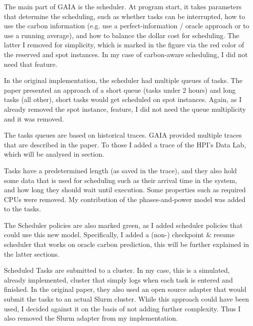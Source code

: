The main part of GAIA is the scheduler. At program start, it takes parameters that determine the scheduling, such as whether tasks can be interrupted, how to use the carbon information (e.g. use a perfect-information / oracle approach or to use a running average), and how to balance the dollar cost for scheduling. 
The latter I removed for simplicity, which is marked in the figure via the red color of the reserved and spot instances. In my case of carbon-aware scheduling, I did not need that feature.

In the original implementation, the scheduler had multiple queues of tasks. 
The paper presented an approach of a short queue (tasks under 2 hours) and long tasks (all other), short tasks would get scheduled on spot instances. 
Again, as I already removed the spot instance, feature, I did not need the queue multiplicity and it was removed.

The tasks queues are based on historical traces. GAIA provided multiple traces that are described in the paper. To those I added a trace of the HPI's Data Lab, which will be analysed in section.

Tasks have a predetermined length (as saved in the trace), and they also hold some data that is used for scheduling such as their arrival time in the system, and how long they should wait until execution. 
Some properties such as required CPUs were removed.
My contribution of the phases-and-power model was added to the tasks.

The Scheduler policies are also marked green, as I added scheduler policies that could use this new model. Specifically, I added a (non-) checkpoint \& resume scheduler that works on oracle carbon prediction, this will be further explained in the latter sections.

Scheduled Tasks are submitted to a cluster.
In my case, this is a simulated, already implemented, cluster that simply logs when each task is entered and finished. 
In the original paper, they also used an open source adapter that would submit the tasks to an actual Slurm cluster. 
While this approach could have been used, I decided against it on the basis of not adding further complexity. 
Thus I also removed the Slurm adapter from my implementation.

